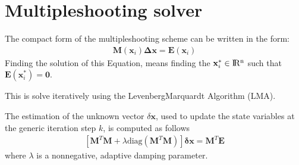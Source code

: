 \documentclass[letterpaper,10pt,english,openany,oneside]{sphinxmanual}
\begin{document}
\section{Multiple\sphinxhyphen{}shooting solver}
\label{\detokenize{multiple_shooting/ms_solver:multiple-shooting-solver}}\label{\detokenize{multiple_shooting/ms_solver::doc}}
The compact form of the multiple\sphinxhyphen{}shooting scheme can be written in the form:
\begin{equation*}
\begin{split}\mathbf{M}(\mathbf{x}_i) \mathbf{\Delta \mathbf{x}} = \mathbf{E}(\mathbf{x}_i)\end{split}
\end{equation*}
Finding the solution of this Equation, means finding the \(\mathbf{x}^{*}_i \in \rm I\!R^{n}\) such that \(\mathbf{E}(\mathbf{x}_i^*) = \mathbf{0}\).

This is solve iteratively using the Levenberg\sphinxhyphen{}Marquardt Algorithm (LMA).

The estimation of the unknown vector \(\delta \mathbf{x}\), used to update the state variables at the generic iteration step \(k\), is computed as follows
\begin{equation}\label{equation:multiple_shooting/ms_solver:LMA}
\begin{split}\left[ \mathbf{M}^{T}\mathbf{M} + \lambda \text{diag}(\mathbf{M}^{T}\mathbf{M}) \right]\mathbf{\delta \mathbf{x}} =  \mathbf{M}^{T} \mathbf{E}\end{split}
\end{equation}
where \(\lambda\) is a non\sphinxhyphen{}negative, adaptive damping parameter.
\end{document}
